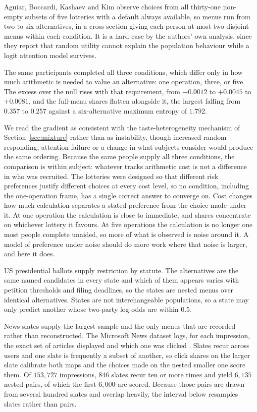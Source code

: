 \documentclass[11pt]{article}
\theoremstyle{italichead}
\begin{document}
Aguiar, Boccardi, Kashaev and Kim \cite{aguiar2023} observe choices from all thirty-one
non-empty subsets of five lotteries with a default always available, so menus run from two
to six alternatives, in a cross-section giving each person at most two disjoint menus within each condition. It is a hard case by the
authors' own analysis, since they report that random utility cannot explain the population behaviour
while a logit attention model survives.

The same participants completed all three conditions, which differ only in how much
arithmetic is needed to value an alternative: one operation, three, or five. The excess
over the null rises with that requirement, from $-0.0012$ to $+0.0045$ to $+0.0081$, and
the full-menu shares flatten alongside it, the largest falling from $0.357$ to $0.257$
against a six-alternative maximum entropy of $1.792$.

We read the gradient as consistent with the taste-heterogeneity mechanism of
Section~\ref{sec:mixture} rather than as instability, though
increased random responding, attention failure or a change in what subjects consider would
produce the same ordering. Because the same people supply all three conditions, the
comparison is within subject: whatever tracks arithmetic cost is not a difference in who was
recruited. The lotteries were designed so that different risk preferences justify different
choices at every cost level, so no condition, including the one-operation frame, has a single
correct answer to converge on. Cost changes how much calculation separates a stated preference
from the choice made under it. At one operation the calculation is close to
immediate, and shares concentrate on whichever lottery it favours. At five operations the
calculation is no longer one most people complete unaided, so more of what is observed is
noise around it. A model of preference under noise should do more work where that noise is
larger, and here it does.

US presidential ballots supply restriction by statute. The alternatives are the same named
candidates in every state and which of them appears varies with petition thresholds and
filing deadlines, so the states are nested menus over identical alternatives. States are
not interchangeable populations, so a state may only predict another whose two-party log
odds are within $0.5$.

News slates supply the largest sample and the only menus that are recorded rather than
reconstructed. The Microsoft News dataset logs, for each impression, the exact set of
articles displayed and which one was clicked \cite{wu2020}. Slates recur across users and
one slate is frequently a subset of another, so click shares on the larger slate calibrate
both maps and the choices made on the nested smaller one score them. Of $153{,}727$
impressions, $846$ slates recur ten or more times and yield $6{,}135$ nested pairs, of which the first
$6{,}000$ are scored. Because
those pairs are drawn from several hundred slates and overlap heavily, the interval below
resamples slates rather than pairs.
\end{document}
